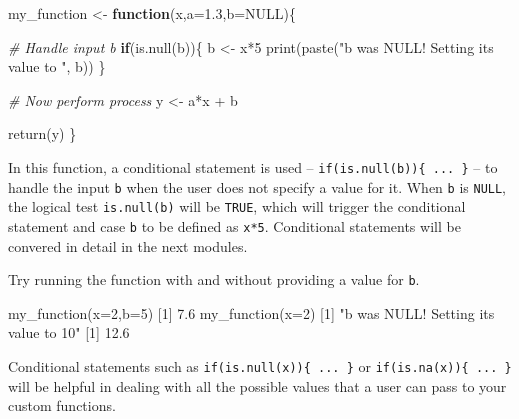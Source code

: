 \documentclass[
]{book}
\newenvironment{Shaded}{\begin{snugshade}}{\end{snugshade}}
\newcommand{\AttributeTok}[1]{\textcolor[rgb]{0.77,0.63,0.00}{#1}}
\newcommand{\CommentTok}[1]{\textcolor[rgb]{0.56,0.35,0.01}{\textit{#1}}}
\newcommand{\ConstantTok}[1]{\textcolor[rgb]{0.00,0.00,0.00}{#1}}
\newcommand{\ControlFlowTok}[1]{\textcolor[rgb]{0.13,0.29,0.53}{\textbf{#1}}}
\newcommand{\DecValTok}[1]{\textcolor[rgb]{0.00,0.00,0.81}{#1}}
\newcommand{\FloatTok}[1]{\textcolor[rgb]{0.00,0.00,0.81}{#1}}
\newcommand{\FunctionTok}[1]{\textcolor[rgb]{0.00,0.00,0.00}{#1}}
\newcommand{\NormalTok}[1]{#1}
\newcommand{\OtherTok}[1]{\textcolor[rgb]{0.56,0.35,0.01}{#1}}
\newcommand{\SpecialCharTok}[1]{\textcolor[rgb]{0.00,0.00,0.00}{#1}}
\newcommand{\StringTok}[1]{\textcolor[rgb]{0.31,0.60,0.02}{#1}}
\begin{document}
\begin{Shaded}
\begin{Highlighting}[]
\NormalTok{my\_function }\OtherTok{\textless{}{-}} \ControlFlowTok{function}\NormalTok{(x,}\AttributeTok{a=}\FloatTok{1.3}\NormalTok{,}\AttributeTok{b=}\ConstantTok{NULL}\NormalTok{)\{}
  
  \CommentTok{\# Handle input \textasciigrave{}b\textasciigrave{}}
  \ControlFlowTok{if}\NormalTok{(}\FunctionTok{is.null}\NormalTok{(b))\{}
\NormalTok{    b }\OtherTok{\textless{}{-}}\NormalTok{ x}\SpecialCharTok{*}\DecValTok{5}
    \FunctionTok{print}\NormalTok{(}\FunctionTok{paste}\NormalTok{(}\StringTok{"b was NULL! Setting its value to "}\NormalTok{, b))}
\NormalTok{  \}}
  
  \CommentTok{\# Now perform process}
\NormalTok{  y }\OtherTok{\textless{}{-}}\NormalTok{ a}\SpecialCharTok{*}\NormalTok{x }\SpecialCharTok{+}\NormalTok{ b}
  
  \FunctionTok{return}\NormalTok{(y)}
\NormalTok{\}}
\end{Highlighting}
\end{Shaded}

In this function, a conditional statement is used -- \texttt{if(is.null(b))\{\ ...\ \}} -- to handle the input \texttt{b} when the user does not specify a value for it. When \texttt{b} is \texttt{NULL}, the logical test \texttt{is.null(b)} will be \texttt{TRUE}, which will trigger the conditional statement and case \texttt{b} to be defined as \texttt{x*5}. Conditional statements will be convered in detail in the next modules.

Try running the function with and without providing a value for \texttt{b}.

\begin{Shaded}
\begin{Highlighting}[]
\FunctionTok{my\_function}\NormalTok{(}\AttributeTok{x=}\DecValTok{2}\NormalTok{,}\AttributeTok{b=}\DecValTok{5}\NormalTok{)}
\NormalTok{[}\DecValTok{1}\NormalTok{] }\FloatTok{7.6}
\FunctionTok{my\_function}\NormalTok{(}\AttributeTok{x=}\DecValTok{2}\NormalTok{)}
\NormalTok{[}\DecValTok{1}\NormalTok{] }\StringTok{"b was NULL! Setting its value to  10"}
\NormalTok{[}\DecValTok{1}\NormalTok{] }\FloatTok{12.6}
\end{Highlighting}
\end{Shaded}

Conditional statements such as \texttt{if(is.null(x))\{\ ...\ \}} or \texttt{if(is.na(x))\{\ ...\ \}} will be helpful in dealing with all the possible values that a user can pass to your custom functions.
\end{document}
